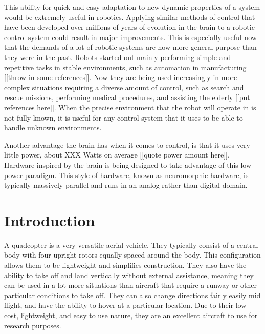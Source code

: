 \documentclass[letterpaper,12pt,titlepage,oneside,final]{book}
\begin{document}
This ability for quick and easy adaptation to new dynamic properties of a system would be extremely useful in robotics. Applying similar methods of control that have been developed over millions of years of evolution in the brain to a robotic control system could result in major improvements. This is especially useful now that the demands of a lot of robotic systems are now more general purpose than they were in the past. Robots started out mainly performing simple and repetitive tasks in stable environments, such as automation in manufacturing [[throw in some references]]. Now they are being used increasingly in more complex situations requiring a diverse amount of control, such as search and rescue missions, performing medical procedures, and assisting the elderly [[put references here]]. When the precise environment that the robot will operate in is not fully known, it is useful for any control system that it uses to be able to handle unknown environments.

Another advantage the brain has when it comes to control, is that it uses very little power, about XXX Watts on average [[quote power amount here]]. Hardware inspired by the brain is being designed to take advantage of this low power paradigm. This style of hardware, known as neuromorphic hardware, is typically massively parallel and runs in an analog rather than digital domain.

\section{Introduction}


A quadcopter is a very versatile aerial vehicle. They typically consist of a central body with four upright rotors equally spaced around the body. This configuration allows them to be lightweight and simplifies construction. They also have the ability to take off and land vertically without external assistance, meaning they can be used in a lot more situations than aircraft that require a runway or other particular conditions to take off. They can also change directions fairly easily mid flight, and have the ability to hover at a particular location. Due to their low cost, lightweight, and easy to use nature, they are an excellent aircraft to use for research purposes.
\end{document}
